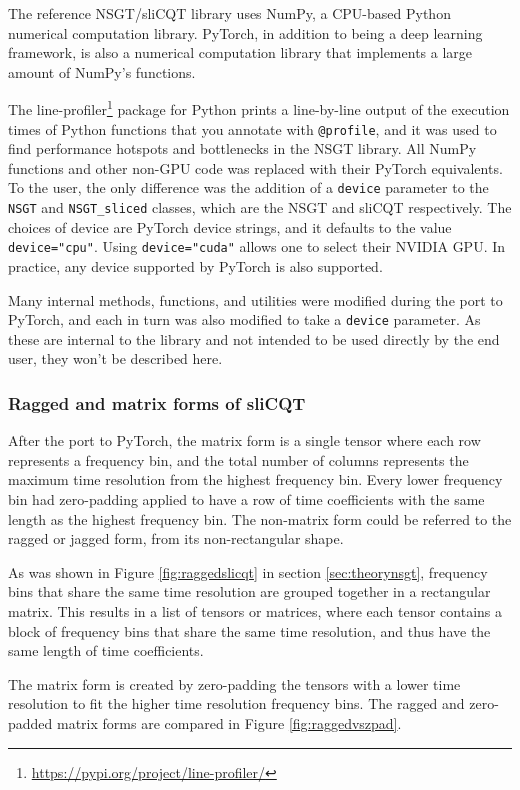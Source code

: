 \documentclass[report.tex]{subfiles}
\begin{document}
The reference NSGT/sliCQT library uses NumPy, a CPU-based Python numerical computation library. PyTorch, in addition to being a deep learning framework, is also a numerical computation library that implements a large amount of NumPy's functions.

The line-profiler\footnote{\url{https://pypi.org/project/line-profiler/}} package for Python prints a line-by-line output of the execution times of Python functions that you annotate with \Verb#@profile#, and it was used to find performance hotspots and bottlenecks in the NSGT library. All NumPy functions and other non-GPU code was replaced with their PyTorch equivalents. To the user, the only difference was the addition of a \Verb#device# parameter to the \Verb#NSGT# and \Verb#NSGT_sliced# classes, which are the NSGT and sliCQT respectively. The choices of device are PyTorch device strings, and it defaults to the value \Verb#device="cpu"#. Using \Verb#device="cuda"# allows one to select their NVIDIA GPU. In practice, any device supported by PyTorch is also supported.

Many internal methods, functions, and utilities were modified during the port to PyTorch, and each in turn was also modified to take a \Verb#device# parameter. As these are internal to the library and not intended to be used directly by the end user, they won't be described here.

\subsubsection{Ragged and matrix forms of sliCQT}
\label{sec:slicqtshape}

After the port to PyTorch, the matrix form is a single tensor where each row represents a frequency bin, and the total number of columns represents the maximum time resolution from the highest frequency bin. Every lower frequency bin had zero-padding applied to have a row of time coefficients with the same length as the highest frequency bin. The non-matrix form could be referred to the ragged or jagged form, from its non-rectangular shape.

As was shown in Figure \ref{fig:raggedslicqt} in section \ref{sec:theorynsgt}, frequency bins that share the same time resolution are grouped together in a rectangular matrix. This results in a list of tensors or matrices, where each tensor contains a block of frequency bins that share the same time resolution, and thus have the same length of time coefficients.

The matrix form is created by zero-padding the tensors with a lower time resolution to fit the higher time resolution frequency bins. The ragged and zero-padded matrix forms are compared in Figure \ref{fig:raggedvszpad}.
\end{document}
